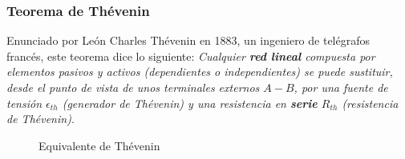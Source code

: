 \documentclass[11pt]{book} %
\begin{document}
\subsubsection{Teorema de Thévenin}
Enunciado por León Charles Thévenin en 1883, un ingeniero de telégrafos francés, este teorema dice lo siguiente:  \textit{Cualquier \textbf{red lineal} compuesta por elementos pasivos y activos (dependientes o independientes) se puede sustituir, desde el punto de vista de unos terminales externos $A-B$, por una fuente de tensión $\epsilon_{th}$ (generador de Thévenin) y una resistencia en \textbf{serie} $R_{th}$ (resistencia de Thévenin)}.
\begin{figure}[htbp]
        \centering
        \hfil
        \caption{Equivalente de Thévenin}
        \label{fig.thevenin}
    \end{figure}
    
\end{document}
